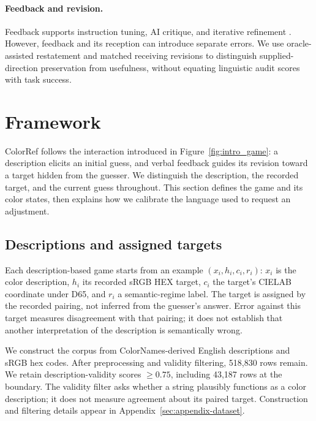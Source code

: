 \documentclass[11pt]{article}
\begin{document}
\paragraph{Feedback and revision.}
Feedback supports instruction tuning, AI critique, and iterative refinement
\citep{ouyang2022training,bai2022constitutional,saunders2022selfcritiquing,
madaan2023selfrefine,shinn2023reflexion}. However, feedback and its reception
can introduce separate errors. We use oracle-assisted restatement and matched
receiving revisions to distinguish supplied-direction preservation from
usefulness, without equating linguistic audit scores with task success.

\section{Framework}
\label{sec:colorref}

ColorRef follows the interaction introduced in Figure~\ref{fig:intro_game}:
a description elicits an initial guess, and verbal feedback guides its
revision toward a target hidden from the guesser. We distinguish the
description, the recorded target, and the current guess throughout. This
section defines the game and its color states, then explains how we
calibrate the language used to request an adjustment.

\subsection{Descriptions and assigned targets}
\label{sec:dataset}
Each description-based game starts from an example $(x_i,h_i,c_i,r_i)$:
$x_i$ is the color description, $h_i$ its recorded sRGB HEX target,
$c_i$ the target's CIELAB coordinate under D65, and $r_i$ a semantic-regime
label. The target is assigned by the recorded pairing, not inferred from
the guesser's answer. Error against this target measures disagreement with
that pairing; it does not establish that another interpretation of the
description is semantically wrong.

We construct the corpus from ColorNames-derived English descriptions and
sRGB hex codes. After preprocessing and validity filtering, 518{,}830 rows
remain.
We retain description-validity scores $\geq 0.75$, including 43{,}187 rows
at the boundary. The validity filter asks whether a string plausibly functions as a color
description; it does not measure agreement about its paired target.
Construction and filtering details appear in Appendix~\ref{sec:appendix-dataset}.
\end{document}
